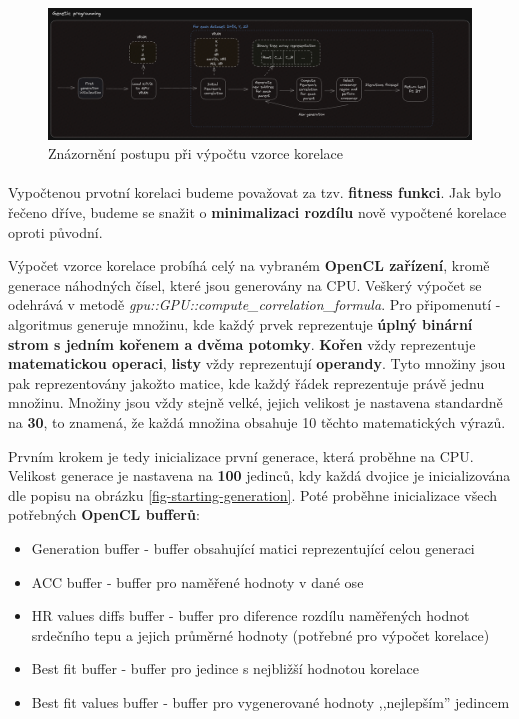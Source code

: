 \documentclass[12pt, a4paper]{article}
\begin{document}
\begin{figure}
  \centering
  \includegraphics[width=\linewidth]{assets/ppr_diagram_p3.png}
  \caption{Znázornění postupu při výpočtu vzorce korelace}
\end{figure}

\paragraph{} Vypočtenou prvotní korelaci budeme považovat za tzv. \textbf{fitness funkci}. 
Jak bylo řečeno dříve, budeme se snažit o \textbf{minimalizaci rozdílu} nově vypočtené korelace oproti původní.

Výpočet vzorce korelace probíhá celý na vybraném \textbf{OpenCL zařízení}, kromě generace náhodných čísel, které jsou generovány na CPU.
Veškerý výpočet se odehrává v metodě \textit{gpu::GPU::compute\_correlation\_formula}.
Pro připomenutí - algoritmus generuje množinu, kde každý prvek reprezentuje \textbf{úplný binární strom s jedním kořenem a dvěma potomky}. \textbf{Kořen} vždy reprezentuje \textbf{matematickou operaci}, \textbf{listy} vždy reprezentují \textbf{operandy}.
Tyto množiny jsou pak reprezentovány jakožto matice, kde každý řádek reprezentuje právě jednu množinu. 
Množiny jsou vždy stejně velké, jejich velikost je nastavena standardně na \textbf{30}, to znamená, že každá množina obsahuje 10 těchto matematických výrazů.

Prvním krokem je tedy inicializace první generace, která proběhne na CPU.
Velikost generace je nastavena na \textbf{100} jedinců, kdy každá dvojice je inicializována dle popisu na obrázku \ref{fig-starting-generation}.
Poté proběhne inicializace všech potřebných \textbf{OpenCL bufferů}:

\begin{itemize}
  \item Generation buffer - buffer obsahující matici reprezentující celou generaci
  \item ACC buffer - buffer pro naměřené hodnoty v dané ose 
  \item HR values diffs buffer - buffer pro diference rozdílu naměřených hodnot srdečního tepu a jejich průměrné hodnoty (potřebné pro výpočet korelace)
  \item Best fit buffer - buffer pro jedince s nejbližší hodnotou korelace
  \item Best fit values buffer - buffer pro vygenerované hodnoty ,,nejlepším'' jedincem
\end{itemize}
\end{document}

